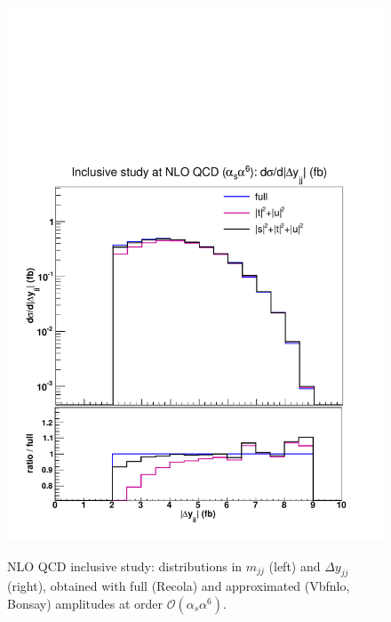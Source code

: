 \begin{figure}[hbt]
{\includegraphics[scale=0.35]{figures/scanfigures/dyjj_nlo.pdf}}
\caption{NLO QCD inclusive study: distributions in $m_{jj}$ (left) and $\Delta y_{jj}$ (right), obtained with full ({\sc Recola}) and approximated ({\sc Vbfnlo, Bonsay}) amplitudes at order $\mathcal{O}(\alpha_s\alpha^6)$.} \label{fig:mjjdyjj_1d_1}
\end{figure}

